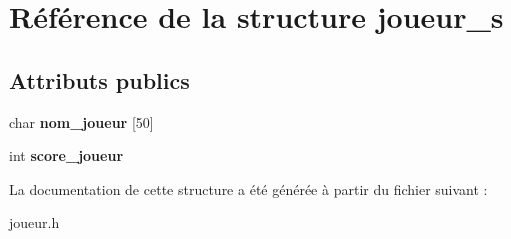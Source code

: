 \hypertarget{structjoueur__s}{}\section{Référence de la structure joueur\+\_\+s}
\label{structjoueur__s}
\subsection*{Attributs publics}
\begin{DoxyCompactItemize}
\item 
char {\bfseries nom\+\_\+joueur} \mbox{[}50\mbox{]}\hypertarget{structjoueur__s_a26638b5da4a078e54282f47c64f86df3}{}\label{structjoueur__s_a26638b5da4a078e54282f47c64f86df3}

\item 
int {\bfseries score\+\_\+joueur}\hypertarget{structjoueur__s_a2e5c01e6762dd126b324420259b29d59}{}\label{structjoueur__s_a2e5c01e6762dd126b324420259b29d59}

\end{DoxyCompactItemize}


La documentation de cette structure a été générée à partir du fichier suivant \+:\begin{DoxyCompactItemize}
\item 
joueur.\+h\end{DoxyCompactItemize}
